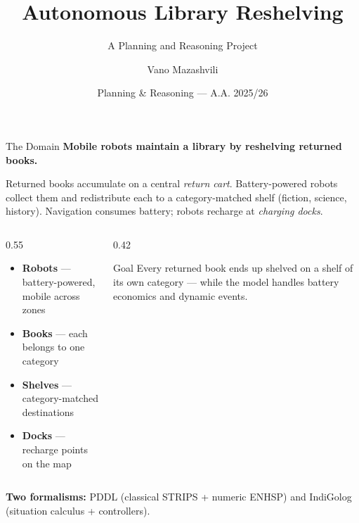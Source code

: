 \documentclass{beamer}
\title{Autonomous Library Reshelving}
\subtitle{A Planning and Reasoning Project}
\author{Vano Mazashvili}
\date{Planning \& Reasoning --- A.A. 2025/26}
\begin{document}
\maketitle

\begin{frame}{The Domain}
\textbf{Mobile robots maintain a library by reshelving returned books.}

\vspace{0.5em}
Returned books accumulate on a central \emph{return cart}. Battery-powered
robots collect them and redistribute each to a category-matched shelf
(fiction, science, history). Navigation consumes battery; robots recharge at
\emph{charging docks}.

\vspace{0.6em}
\begin{columns}
\begin{column}{0.55\textwidth}
\begin{itemize}
  \item \textbf{Robots} --- battery-powered, mobile across zones
  \item \textbf{Books} --- each belongs to one category
  \item \textbf{Shelves} --- category-matched destinations
  \item \textbf{Docks} --- recharge points on the map
\end{itemize}
\end{column}
\begin{column}{0.42\textwidth}
\begin{block}{Goal}
Every returned book ends up shelved on a shelf of its own category --- while
the model handles battery economics and dynamic events.
\end{block}
\end{column}
\end{columns}

\vspace{0.2em}
\textbf{Two formalisms:} PDDL (classical STRIPS + numeric ENHSP) and IndiGolog
(situation calculus + controllers).
\end{frame}
\end{document}

